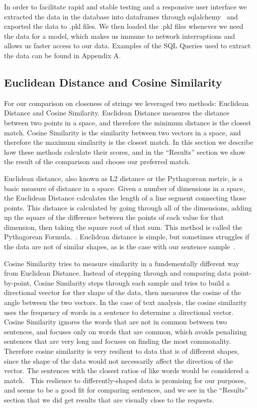 \documentclass[runningheads]{llncs}
\begin{document}
	In order to facilitate rapid and stable testing and a responsive user interface we extracted the data in the database into dataframes through sqlalchemy~\cite{ref_url15} and exported the data to .pkl files. We then loaded the .pkl files whenever we need the data for a model, which makes us immune to network interruptions and allows us faster access to our data. Examples of the SQL Queries used to extract the data can be found in Appendix A.
	

	\subsection{Euclidean Distance and Cosine Similarity}	
	For our comparison on closeness of strings we leveraged two methods: Euclidean Distance and Cosine Similarity. Euclidean Distance measures the distance between two points in a space, and therefore the minimum distance is the closest match. Cosine Similarity is the similarity between two vectors in a space, and therefore the maximum similarity is the closest match. In this section we describe how these methods calculate their scores, and in the ``Results'' section we show the result of the comparison and choose our preferred match.
	
Euclidean distance, also known as L2 distance or the Pythagorean metric, is a basic measure of distance in a space. Given a number of dimensions in a space, the Euclidean Distance calculates the length of a line segment connecting those points. This distance is calculated by going through all of the dimensions, adding up the square of the difference between the points of each value for that dimension, then taking the square root of that sum. This method is called the Pythagorean Formula.~\cite{ref_url19}. Euclidean distance is simple, but sometimes struggles if the data are not of similar shapes, as is the case with our sentence sample~\cite{ref_url19}.

Cosine Similarity tries to measure similarity in a fundementally different way from Euclidean Distance. Instead of stepping through and comparing data point-by-point, Cosine Similarity steps through each sample and tries to build a directional veector for ther shape of the data, then measures the cosine of the angle between the two vectors. In the case of text analysis, the cosine similarity uses the frequency of words in a sentence to determine a directional vector. Cosine Similarity ignores the words that are not in common between two sentences, and focuses only on words that are common, which avoids penalizing sentences that are very long and focuses on finding the most commonality. Therefore cosine similarity is very resilient to data that is of different shapes, since the shape of the data would not necessarily affect the direction of the vector. The sentences with the closest ratios of like words would be considered a match.~\cite{ref_book1} This reslience to differently-shaped data is promising for our purposes, and seems to be a good fit for comparing sentences, and we see in the ``Results'' section that we did get results that are visually close to the requests.
\end{document}
